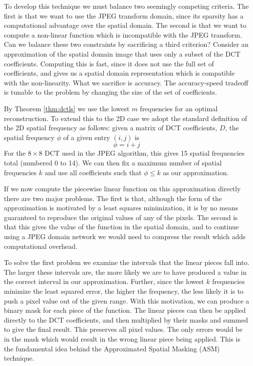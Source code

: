 \documentclass[10pt,twocolumn,letterpaper]{article}
\begin{document}
To develop this technique we must balance two seemingly competing criteria. The first is that we want to use the JPEG transform domain, since its sparsity has a computational advantage over the spatial domain. The second is that we want to compute a non-linear function which is incompatible with the JPEG transform. Can we balance these two constraints by sacrificing a third criterion? Consider an approximation of the spatial domain image that uses only a subset of the DCT coefficients. Computing this is fast, since it does not use the full set of coefficients, and gives us a spatial domain representation which is compatible with the non-linearity. What we sacrifice is accuracy. The accuracy-speed tradeoff is tunable to the problem by changing the size of the set of coefficients.

By Theorem \ref{thm:dctls} we use the lowest $m$ frequencies for an optimal reconstruction. To extend this to the 2D case we adopt the standard definition of the 2D spatial frequency as follows: given a matrix of DCT coefficients, $D$, the spatial frequency $\phi$ of a given entry $(i,j)$ is 
\begin{equation}
\phi = i + j
\end{equation}
For the $8 \times 8$ DCT used in the JPEG algorithm, this gives 15 spatial frequencies total (numbered 0 to 14). We can then fix a maximum number of spatial frequencies $k$ and use all coefficients such that $\phi \leq k$ as our approximation. 

If we now compute the piecewise linear function on this approximation directly there are two major problems. The first is that, although the form of the approximation is motivated by a least squares minimization, it is by no means guaranteed to reproduce the original values of any of the pixels. The second is that this gives the value of the function in the spatial domain, and to continue using a JPEG domain network we would need to compress the result which adds computational overhead.

To solve the first problem we examine the intervals that the linear pieces fall into. The larger these intervals are, the more likely we are to have produced a value in the correct interval in our approximation. Further, since the lowest $k$ frequencies minimize the least squared error, the higher the frequency, the less likely it is to push a pixel value out of the given range. With this motivation, we can produce a binary mask for each piece of the function. The linear pieces can then be applied directly to the DCT coefficients, and then multiplied by their masks and summed to give the final result. This preserves all pixel values. The only errors would be in the mask which would result in the wrong linear piece being applied. This is the fundamental idea behind the Approximated Spatial Masking (ASM) technique.
\end{document}
